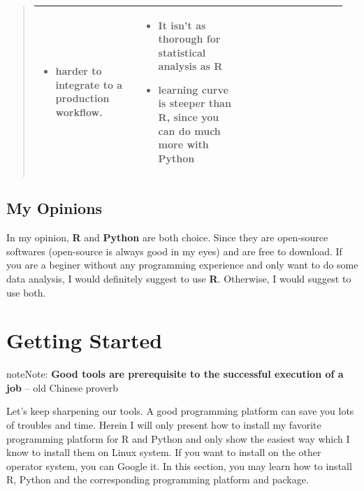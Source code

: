 \documentclass[letterpaper,11pt,english]{sphinxmanual}
\begin{document}
\begin{quote}
\begin{tabular}{|p{0.317\linewidth}|p{0.317\linewidth}|p{0.317\linewidth}|}
\begin{itemize}
\item {} 
harder to integrate to a production workflow.

\end{itemize}
 & \begin{itemize}
\item {} 
It isn't as thorough for statistical analysis as R

\item {} 
learning curve is steeper than R, since you can do much more with Python

\end{itemize}
\\
\hline\end{tabular}

\end{quote}


\section{My Opinions}
\label{comparison:my-opinions}
In my opinion, \textbf{R} and \textbf{Python} are both choice.  Since they are open-source softwares (open-source is always good in my eyes) and are free to download. If you are a beginer without any programming experience and only want to do some data analysis, I would definitely suggest to use \textbf{R}. Otherwise, I would suggest to use both.


\chapter{Getting Started}
\label{gettingstarted:yassine-alouini}\label{gettingstarted:getting-started}\label{gettingstarted::doc}\label{gettingstarted:gettingstarted}
\begin{notice}{note}{Note:}
\textbf{Good tools are prerequisite to the successful execution of a job} -- old Chinese proverb
\end{notice}

Let's keep sharpening our tools. A good programming platform can save you
lots of troubles and time. Herein I will only present how to install my
favorite programming platform for R and Python and only show the easiest
way which I know to install them on Linux system. If you want to install
on the other operator system, you can Google it. In this section, you may
learn how to install R, Python and the corresponding programming platform
and package.

\end{document}
